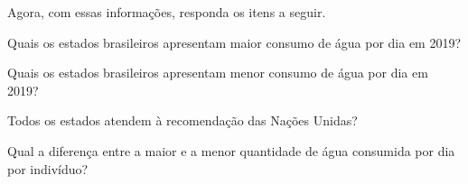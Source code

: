 Agora, com essas informações, responda os itens a seguir. 

\begin{escolha}
\item Quais os estados brasileiros apresentam maior consumo de água por dia em 2019?

\item Quais os estados brasileiros apresentam menor consumo de água por dia em 2019?

\item Todos os estados atendem à recomendação das Nações Unidas?

\item Qual a diferença entre a maior e a menor quantidade de água consumida por dia por indivíduo?
\end{escolha}

